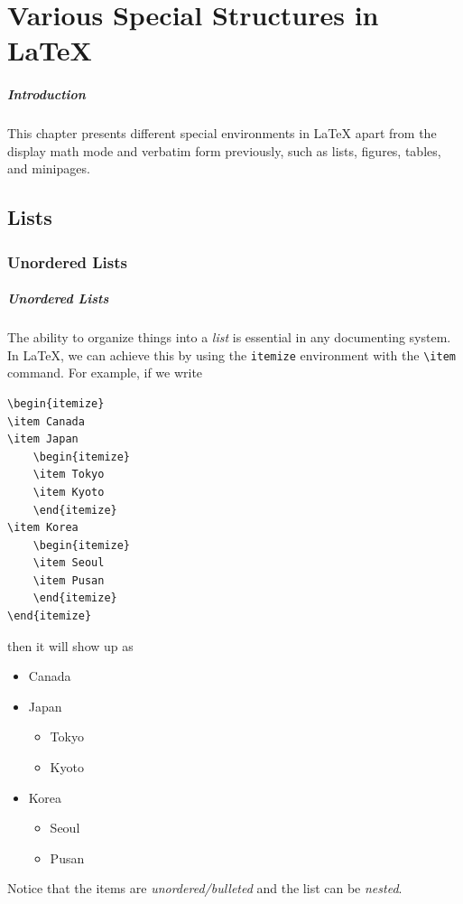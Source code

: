 \chapter{Various Special Structures in \LaTeX{}}

\paragraph{Introduction}
This chapter presents different special environments in \LaTeX{} apart from the display math mode and verbatim form previously, such as lists, figures, tables, and minipages.

\section{Lists}

\subsection{Unordered Lists}

\paragraph{Unordered Lists}
The ability to organize things into a \textit{list} is essential in any documenting system. In \LaTeX{}, we can achieve this by using the \verb|itemize| environment with the \texttt{\textbackslash item} command. For example, if we write
\begin{lstlisting}
\begin{itemize}
\item Canada
\item Japan 
    \begin{itemize}
    \item Tokyo
    \item Kyoto
    \end{itemize}
\item Korea 
    \begin{itemize}
    \item Seoul
    \item Pusan
    \end{itemize}
\end{itemize}  
\end{lstlisting}
then it will show up as
\begin{itemize}
\item Canada
\item Japan \begin{itemize}
    \item Tokyo
    \item Kyoto
    \end{itemize}
\item Korea \begin{itemize}
    \item Seoul
    \item Pusan
    \end{itemize}
\end{itemize}  
Notice that the items are \textit{unordered/bulleted} and the list can be \textit{nested}.

